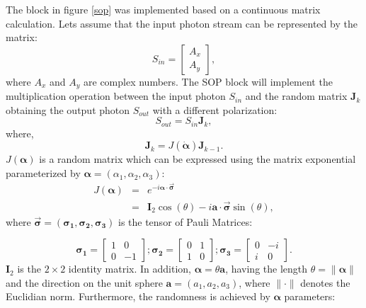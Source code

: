 \begin{refsection}
  The block in figure \ref{sop} was implemented based on a continuous matrix calculation. Lets assume that the input photon stream can be represented by the matrix:
  \begin{equation}\label{inputphoton}
  S_{in} =
    \begin{bmatrix}
    A_x \\
    A_y
  \end{bmatrix},
  \end{equation}
  where $A_x$ and $A_y$ are complex numbers. The SOP block will implement the multiplication operation between the input photon $S_{in}$ and the random matrix $\textbf{J}_k$ obtaining the output photon $S_{out}$ with a different polarization:
  \begin{equation}\label{sop_mult}
    S_{out} = S_{in} \textbf{J}_k,
  \end{equation}
  where,
  \begin{equation}\label{eq_jk}
    \textbf{J}_k = J(\pmb{\dot{\alpha}})\textbf{J}_{k-1}.
  \end{equation}
  $J(\pmb{\alpha})$ is a random matrix which can be expressed using the matrix exponential parameterized by $\pmb{\alpha}=(\alpha_1,\alpha_2, \alpha_3)$:
  \begin{eqnarray}
   \nonumber %
    J(\pmb{\alpha})    &=& e^{-i \pmb{{\alpha}} \cdot \pmb{\vec{\sigma}}} \\
                            &=& \textbf{I}_2 \cos(\theta)-i\textbf{a} \cdot \pmb{\vec{\sigma}} \sin(\theta),
  \end{eqnarray}
  where $\pmb{\vec{\sigma}} = (\pmb{\sigma_1}, \pmb{\sigma_2}, \pmb{\sigma_3})$ is the tensor of Pauli Matrices:

  \begin{equation}\label{eqPauli1}
    \pmb{\sigma_1}=
    \begin{bmatrix}
      1 & 0 \\
      0 & -1
    \end{bmatrix};
    \pmb{\sigma_2}=
    \begin{bmatrix}
      0 & 1 \\
      1 & 0
    \end{bmatrix};
    \pmb{\sigma_3}=
    \begin{bmatrix}
      0 & -i \\
      i & 0
    \end{bmatrix}.
  \end{equation}
$\textbf{I}_2$ is the $2 \times 2$ identity matrix. In addition, $\pmb{\alpha} = \theta \pmb{a}$, having the length $\theta = \|\pmb{\alpha}\|$ and the direction on the unit sphere $\pmb{a} = (a_1,a_2,a_3)$, where $\|\cdot\|$ denotes the Euclidian norm. Furthermore, the randomness is achieved by $\pmb{\alpha}$ parameters:


\end{refsection}

